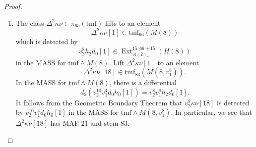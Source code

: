 \documentclass[10pt]{amsart}
\newcommand{\ul}[1]{\underline{#1}}
\newcommand{\tmf}{\mathrm{tmf}}
\newcommand{\bo}{\mathrm{bo}}
\newcommand{\bou}{\ul{\bo}}
\theoremstyle{definition}
\numberwithin{equation}{section}
\numberwithin{figure}{section}
\DeclareMathOperator{\Ext}{Ext}
\begin{document}
\begin{proof}
\begin{enumerate}
We now check that $v_2^{10} v_1^4 h_2 h_0[1]$ is a permanent cycle in the algebraic $\tmf$-resolution for $H(8,v_1^8)$. Its relative position\footnote{We will say that an element $x \in \Ext_{A(2)_*}(H(8,v_1^8))$ has \emph{relative position} $(t-s,s)$ in $\Ext_{A(2)_*}(\bou_I \otimes H(8,v_1^8))$ if the image of a differential supported by $x$ in the algebraic tmf-resolution lies in $\Ext^{s+1,t}_{A(2)_*}(\bou_I\otimes H(8,v_1^8))$, and the image of a differential supported by $x$ in the MASS could be detected in the algebraic tmf-resolution by an element in $\Ext^{s+r,t-r+1}_{A(2)_*}(\bou_1 \otimes H(8,v_1^8))$. In other words, if you were to pretend $x$ were an element in $\Ext^{s,t}_{A(2)_*}(\bou_I\otimes H(8,v_1^8))$, then $d_r$-differentials in the algebriac tmf-resolution ``look'' like Adams $d_1$'s, and $d_r$-differentials in the MASS ``look'' like Adams $d_r$'s.} is $t-s = 65$ and $AF = 17$, its relative position in $\Ext_{A(2)_*}(\bou_1^{\otimes 2} \otimes H(8,v_1^8))$ is $t-s = 58$ and $AF = 16$, and its relative position in $\Ext_{A(2)_*}(\bou_1^{\otimes 3} \otimes H(8,v_1^8))$ is $t-s = 51$ and $AF = 15$, the last of which lies above the vanishing line. Inspection of the relevant charts shows that $v_2^{10} v_1^4 h_2 h_0[1]$ cannot support a nontrivial $d_1$-differential since the target bidegrees are zero. Therefore $v_2^{10} v_1^4 h_2 h_0[1]$ is a permanent cycle in the algebraic $\tmf$-resolution for $H(8,v_1^8)$ and therefore it detects an element $\{v_2^{10} v_1^4 h_2 h_0[1]\}$ in $\Ext_{A_*}(H(8,v_1^8))$. 

Finally, inspection of the same algebraic tmf-resolution charts reveals that there are no possible targets for a nontrivial differential supported by $\{v_2^{10} v_1^4 h_2 h_0[1]\}$ in the MASS for $M(8,v_1^8)$. Therefore $\{v_2^{10} v_1^4 h_2 h_0[1]\}$ is a permanent cycle which detects a lift of $\Delta^2 \nu^2$. 
\vspace{10pt}

\item The class $\Delta^2 \kappa \nu \in \pi_{65}(\tmf)$ lifts to an element 
$$\Delta^2 \kappa \nu[1] \in \tmf_{66}(M(8))$$ 
which is detected by 
$$v_2^8 h_2 d_0[1] \in \Ext_{A(2)_*}^{15,66+15}(H(8))$$ 
in the MASS for $\tmf \wedge M(8)$. Lift $\Delta^2 \kappa \nu[1]$ to an element 
$$\Delta^2 \kappa \nu[18] \in \tmf_{83}(M(8,v_1^8)).$$ In the MASS for $\tmf \wedge M(8)$, there is a differential 
$$d_2(v_2^{10} v_1^4 d_0 h_0[1]) = v_2^8 v_1^8 h_2d_0[1].$$
It follows from the Geometric Boundary Theorem that $v_2^8 \kappa \nu[18]$ is detected by $v_2^{10} v_1^4 d_0 h_0[1]$ in the MASS for $\tmf \wedge M(8,v_1^8)$. 
In particular, we see that $\Delta^2 \kappa \nu[18]$ has MAF $21$ and stem $83$. 


\end{enumerate}
\end{proof}
\end{document}
